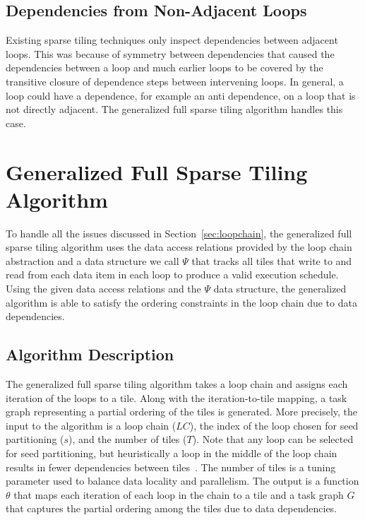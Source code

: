 \subsection{Dependencies from Non-Adjacent Loops}
\label{sec:prevloops}

Existing sparse tiling techniques only inspect 
dependencies between adjacent loops.  This was
because of symmetry between dependencies that caused the dependencies
between a loop and much earlier loops to be covered by the transitive closure
of dependence steps between intervening loops.  In general,
a loop could have a dependence, for example an anti dependence,
on a loop that is not directly adjacent.  The generalized full sparse tiling
algorithm handles this case.
  
\section{Generalized Full Sparse Tiling Algorithm}
\label{sec:generalizedFST}
To handle all the issues discussed in Section~\ref{sec:loopchain}, the generalized
full sparse tiling algorithm uses the data access relations provided by the
loop chain abstraction and a data structure we call $\Psi$ that tracks
all tiles that write to and read from each data item in each loop 
to produce a valid execution schedule.
Using the given data access relations and the $\Psi$ data structure, 
the generalized algorithm is able
to satisfy the ordering constraints in the loop chain due to
data dependencies.

%
\subsection{Algorithm Description}
\label{sec:algorithm}
The generalized full sparse tiling algorithm takes a loop chain
and assigns each iteration of the loops to a tile.
Along with the iteration-to-tile mapping, a task graph representing a partial ordering of the tiles is generated.
More precisely, the input to the algorithm is a loop chain ($LC$), 
the index of the loop chosen for seed partitioning ($s$), and the number of tiles ($T$).
Note that any loop can be selected for seed partitioning, but heuristically a loop in the middle
of the loop chain results in fewer dependencies between tiles~\cite{Strout2001poster}.
The number of tiles is a tuning parameter used to balance data locality and parallelism.
The output is a function $\theta$ that maps each iteration of each loop in 
the chain to a tile and a task graph $G$ that captures the
partial ordering among the tiles due to data dependencies.

